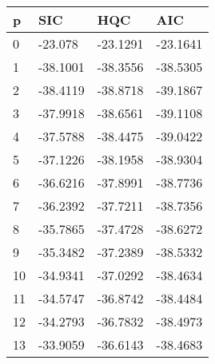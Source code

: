 \begin{tabular}{llll}
p & SIC & HQC & AIC \\ 
\hline 
0 & -23.078 & -23.1291 & -23.1641 \\ 
1 & -38.1001 & -38.3556 & -38.5305 \\ 
2 & -38.4119 & -38.8718 & -39.1867 \\ 
3 & -37.9918 & -38.6561 & -39.1108 \\ 
4 & -37.5788 & -38.4475 & -39.0422 \\ 
5 & -37.1226 & -38.1958 & -38.9304 \\ 
6 & -36.6216 & -37.8991 & -38.7736 \\ 
7 & -36.2392 & -37.7211 & -38.7356 \\ 
8 & -35.7865 & -37.4728 & -38.6272 \\ 
9 & -35.3482 & -37.2389 & -38.5332 \\ 
10 & -34.9341 & -37.0292 & -38.4634 \\ 
11 & -34.5747 & -36.8742 & -38.4484 \\ 
12 & -34.2793 & -36.7832 & -38.4973 \\ 
13 & -33.9059 & -36.6143 & -38.4683 \\ 
\hline 
\end{tabular}
